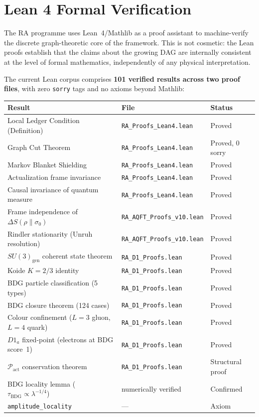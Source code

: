 \documentclass[11pt,a4paper]{article}
\newcommand{\Pact}{\mathcal{P}_{\mathrm{act}}}
\begin{document}
\section{Lean 4 Formal Verification}
\label{sec:lean}

The RA programme uses Lean~4/Mathlib as a proof assistant to machine-verify
the discrete graph-theoretic core of the framework. This is not cosmetic:
the Lean proofs establish that the claims about the growing DAG are
internally consistent at the level of formal mathematics, independently
of any physical interpretation.

The current Lean corpus comprises \textbf{101 verified results across two
proof files}, with zero \texttt{sorry} tags and no axioms beyond Mathlib:

\begin{center}
\renewcommand{\arraystretch}{1.2}
\begin{tabular}{p{5.5cm}p{4cm}p{2.5cm}}
\toprule
Result & File & Status \\
\midrule
Local Ledger Condition (Definition) & \texttt{RA\_Proofs\_Lean4.lean} & Proved \\
Graph Cut Theorem & \texttt{RA\_Proofs\_Lean4.lean} & Proved, 0 sorry \\
Markov Blanket Shielding & \texttt{RA\_Proofs\_Lean4.lean} & Proved \\
Actualization frame invariance & \texttt{RA\_Proofs\_Lean4.lean} & Proved \\
Causal invariance of quantum measure & \texttt{RA\_Proofs\_Lean4.lean} & Proved \\
Frame independence of $\Delta S(\rho\|\sigma_0)$ & \texttt{RA\_AQFT\_Proofs\_v10.lean} & Proved \\
Rindler stationarity (Unruh resolution) & \texttt{RA\_AQFT\_Proofs\_v10.lean} & Proved \\
$SU(3)_{\mathrm{gen}}$ coherent state theorem & \texttt{RA\_D1\_Proofs.lean} & Proved \\
Koide $K = 2/3$ identity & \texttt{RA\_D1\_Proofs.lean} & Proved \\
BDG particle classification (5 types) & \texttt{RA\_D1\_Proofs.lean} & Proved \\
BDG closure theorem (124 cases) & \texttt{RA\_D1\_Proofs.lean} & Proved \\
Colour confinement ($L{=}3$ gluon, $L{=}4$ quark) & \texttt{RA\_D1\_Proofs.lean} & Proved \\
$D1_a$ fixed-point (electrons at BDG score~1) & \texttt{RA\_D1\_Proofs.lean} & Proved \\
$\Pact$ conservation theorem & \texttt{RA\_D1\_Proofs.lean} & Structural proof \\
BDG locality lemma ($\tau_{\mathrm{BDG}} \propto \lambda^{-1/4}$) & numerically verified & Confirmed \\
\midrule
\texttt{amplitude\_locality} & --- & Axiom \\
\bottomrule
\end{tabular}
\end{center}
\end{document}
